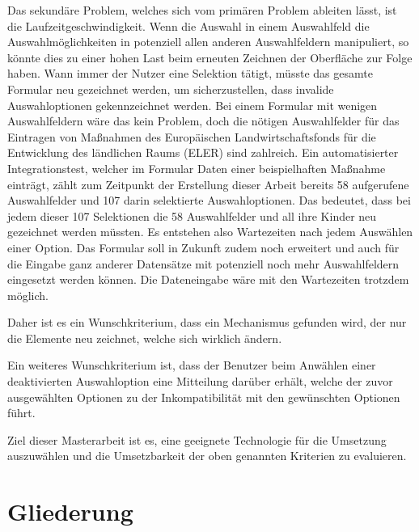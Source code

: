 Das sekundäre Problem,
welches sich vom primären Problem ableiten lässt,
ist die  Laufzeitgeschwindigkeit. 
Wenn die Auswahl in einem Auswahlfeld die Auswahlmöglichkeiten in potenziell allen anderen Auswahlfeldern manipuliert,
so könnte dies zu einer hohen Last beim erneuten Zeichnen der Oberfläche zur Folge haben.
Wann immer der Nutzer eine Selektion tätigt,
müsste das gesamte Formular neu gezeichnet werden,
um sicherzustellen,
dass invalide Auswahloptionen gekennzeichnet werden.
Bei einem  Formular mit wenigen Auswahlfeldern wäre das kein Problem,
doch die nötigen Auswahlfelder für das Eintragen von Maßnahmen des Europäischen Landwirtschaftsfonds für die Entwicklung des ländlichen Raums (ELER) sind zahlreich.
Ein  automatisierter Integrationstest,
welcher im Formular Daten einer beispielhaften Maßnahme einträgt,
zählt zum Zeitpunkt der Erstellung dieser Arbeit bereits 58 aufgerufene Auswahlfelder und 107 darin selektierte Auswahloptionen.
Das bedeutet,
dass bei jedem dieser 107 Selektionen die 58 Auswahlfelder und all ihre Kinder neu gezeichnet werden müssten.
Es entstehen also Wartezeiten nach jedem Auswählen einer Option.
Das Formular soll in Zukunft zudem noch erweitert und auch für die Eingabe ganz anderer Datensätze mit potenziell noch mehr Auswahlfeldern eingesetzt werden können.
Die Dateneingabe wäre mit den Wartezeiten trotzdem möglich.
\begin{newText}Daher ist es ein Wunschkriterium, dass ein Mechanismus gefunden wird,
der nur die Elemente neu zeichnet, welche sich wirklich ändern.\end{newText}

Ein weiteres Wunschkriterium ist,
dass der Benutzer beim Anwählen einer deaktivierten Auswahloption eine Mitteilung darüber erhält,
welche der zuvor ausgewählten Optionen zu der Inkompatibilität mit den gewünschten Optionen führt.

Ziel dieser Masterarbeit ist es, eine geeignete Technologie für die Umsetzung auszuwählen
und die Umsetzbarkeit der  oben genannten Kriterien zu evaluieren.

\section{Gliederung}


